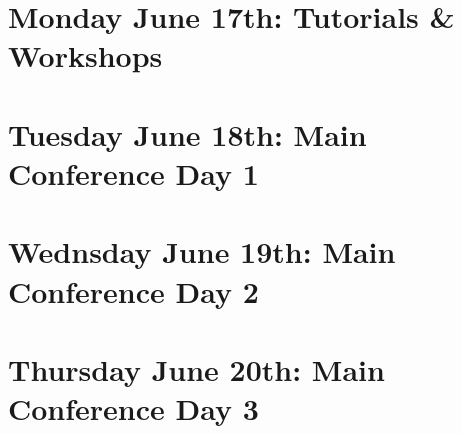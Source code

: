 \documentclass[11pt]{article}
\begin{document}
\newpage
\section{Monday June 17th: Tutorials \& Workshops}


\newpage
\section{Tuesday June 18th: Main Conference Day 1}


\newpage
\section{Wednsday June 19th: Main Conference Day 2}


\newpage
\section{Thursday June 20th: Main Conference Day 3}


\newpage
\end{document}
